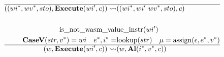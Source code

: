 \begin{align*}
  \hline
  ((\seq{wi}, \seq{wv}, sto), \exe (wi', c))
  \leadsto&
  ((\seq{wi}, wi' ~ \seq{wv}, sto), c) \\
%
\newline \\
  \text{is\_not\_wasm\_val}&\text{ue\_instr}(wi') \\
  \textbf{CaseV} (str, \seq v) = wi \quad
  \seq e, \seq i =& \text{lookup}(str) \quad
  \mu = \text{assign}(\epsilon, \seq e, \seq v) \\
  \hline
  (w, \exe (wi', c)) \leadsto& (w, \al (\seq i, \seq v, c)) \\
\end{align*}




\newpage

